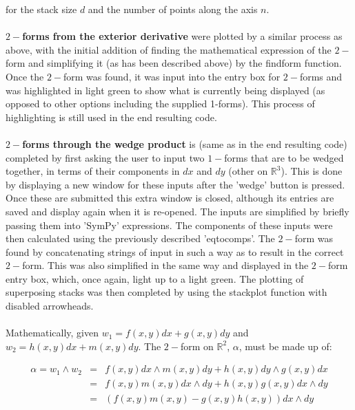 \documentclass[12pt]{report}
\begin{document}
for the stack size $d$ and the number of points along the axis $n$. \\~\\


\textbf{$2-$forms from the exterior derivative} were plotted by a similar process as above, with the initial addition of finding the mathematical expression of the $2-$form and simplifying it (as has been described above) by the find\textunderscore form function. Once the $2-$form was found, it was input into the entry box for $2-$forms and was highlighted in light green to show what is currently being displayed (as opposed to other options including the supplied 1-forms). This process of highlighting is still used in the end resulting code. \\~\\


\textbf{$2-$forms through the wedge product} is (same as in the end resulting code) completed by first asking the user to input two $1-$forms that are to be wedged together, in terms of their components in $dx$ and $dy$ (other on $\mathbb{R}^{3}$). This is done by displaying a new window for these inputs after the 'wedge' button is pressed. Once these are submitted this extra window is closed, although its entries are saved and display again when it is re-opened. The inputs are simplified by briefly passing them into 'SymPy' expressions. The components of these inputs were then calculated using the previously described 'eq\textunderscore to\textunderscore comps'. The $2-$form was found by concatenating strings of input in such a way as to result in the correct $2-$form. This was also simplified in the same way and displayed in the $2-$form entry box, which, once again, light up to a light green. The plotting of superposing stacks was then completed by using the stack\textunderscore plot function with disabled arrowheads.\\~\\

Mathematically, given $w_{1} = f(x, y) dx + g(x, y) dy$  and $w_{2} = h(x, y) dx + m(x, y) dy$. The $2-$form on $\mathbb{R}^{2}$, $\alpha$, must be made up of:


\begin{eqnarray*}
	\label{T2}
		\alpha = w_{1}\wedge w_{2} &=& f(x, y) dx\wedge m(x, y) dy + h(x, y) dy\wedge g(x, y) dx\\
		&=&f(x, y)m(x, y) dx\wedge dy + h(x, y)g(x, y) dx\wedge dy \\&=& (f(x, y)m(x, y) - g(x, y)h(x, y)) dx\wedge dy  
\end{eqnarray*}
\end{document}
